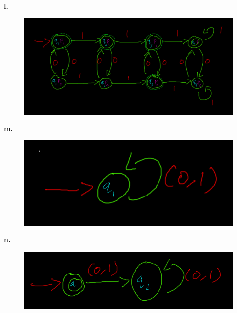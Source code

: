 \documentclass[letter]{article}
\theoremstyle{case}
\begin{document}
\textbf{l.}
\begin{figure}[h!]
	\includegraphics[scale=0.4]{6l.png}
\end{figure}

\textbf{m.}
\begin{figure}[h!]
	\includegraphics[scale=0.4]{6m.png}
\end{figure}
\newpage
\textbf{n.}
\begin{figure}[h!]
	\includegraphics[scale=0.4]{6n.png}
\end{figure}
\end{document}

